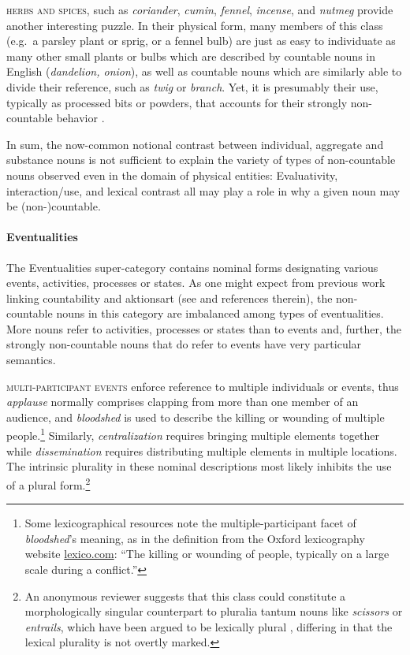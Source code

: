 \documentclass[output=paper]{langscibook}
\begin{document}


\textsc{herbs and spices}, such as \textit{coriander}, \textit{cumin}, \textit{fennel}, \textit{incense}, and \textit{nutmeg} provide another interesting puzzle.  In their physical form, many members of this class (e.g.\ a parsley plant or sprig, or a fennel bulb) are just as easy to individuate as many other small plants or bulbs which are described by countable  nouns in English (\textit{dandelion, onion}), as well as countable nouns which are similarly able to divide their reference, such as \textit{twig} or \textit{branch}.  Yet, it is presumably their use, typically as processed bits or powders, that accounts for their strongly non-countable behavior \citep{Wierzbicka1988}.

In sum, the now-common notional contrast between individual, aggregate and substance nouns is not sufficient to explain the variety of types of non-countable nouns observed even in the domain of physical entities: Evaluativity, interaction/use, and lexical contrast all may play a role in why a given noun may be (non-)countable.

\paragraph*{Eventualities} The Eventualities super-category contains nominal forms designating various events, activities, processes or states.  As one might expect from previous work linking countability and aktionsart (see \citealt{Mourelatos1978, grimm2014individuating} and references therein), the non-countable nouns in this category are imbalanced among types of eventualities. More nouns refer to activities, processes or states than to events and, further, the strongly non-countable nouns that do refer to events have very particular semantics.

\textsc{multi-participant events} enforce  reference to multiple individuals or events, thus \textit{applause} normally comprises clapping from more than one member of an audience, and \textit{bloodshed} is used to describe the killing or wounding of multiple people.\footnote{Some lexicographical resources note the multiple-participant facet of \textit{bloodshed}'s meaning, as in the definition from the Oxford lexicography website \url{lexico.com}: ``The killing or wounding of people, typically on a large scale during a conflict.''}  Similarly, \textit{centralization} requires bringing multiple elements together  while  
\textit{dissemination} requires distributing multiple elements in multiple locations.  The intrinsic plurality in these nominal descriptions most likely inhibits the use of a plural form.\footnote{An anonymous reviewer suggests that this class could constitute a morphologically singular counterpart to pluralia tantum nouns like \textit{scissors} or \textit{entrails}, which have been argued to be lexically plural \citep{Acquaviva2008}, differing in that the lexical plurality is not overtly marked.}
\end{document}
